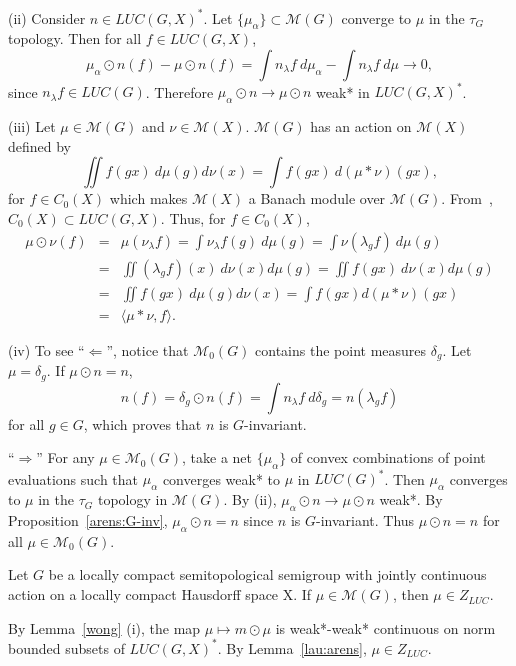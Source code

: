 (ii) Consider $n\in LUC(G,X)^*$.  Let $\{\mu_\alpha\}\subset\mathcal{M}(G)$ converge to $\mu$ in the $\tau_G$ topology.
Then for all $f\in LUC(G,X)$,
\[
{\mu}_\alpha \odot n(f) - {\mu}\odot n (f) = \int n_\lambda f\:d\mu_\alpha - \int n_\lambda f\:d\mu \rightarrow 0,
\]
since $n_\lambda f \in LUC(G)$.  Therefore ${\mu}_\alpha \odot n \rightarrow {\mu}\odot n$ weak* in $LUC(G,X)^*$.

(iii) Let $\mu\in\mathcal{M}(G)$ and $\nu\in\mathcal{M}(X)$.  $\mathcal{M}(G)$ has an action on $\mathcal{M}(X)$ defined by
\[
\iint f(gx)\:d\mu(g)d\nu(x) = \int f(gx)\:d(\mu * \nu)(gx),
\]
for $f\in C_0(X)$ which makes $\mathcal{M}(X)$ a Banach module over $\mathcal{M}(G)$.  From~\cite[p. 299]{gl:aa},
$C_0 (X) \subset LUC(G,X)$.
Thus, for $f\in C_0(X)$,
\begin{eqnarray*}
{\mu}\odot{\nu}(f) & = & {\mu}({\nu}_\lambda f) = \int {\nu}_\lambda f(g)\:d\mu(g) = \int{\nu}(\lambda_g f)\:d\mu(g) \\
& = & \iint (\lambda_g f)(x)\:d\nu(x)d\mu(g) = \iint f(gx)\:d\nu(x)d\mu(g) \\
& = & \iint f(gx)\:d\mu(g)d\nu(x) = \int f(gx) d(\mu * \nu)(gx) \\
& = & \langle {\mu * \nu}, f\rangle.
\end{eqnarray*}

(iv) To see ``$\Leftarrow$'', notice that $\mathcal{M}_0 (G)$ contains the point
measures $\delta_g$.  Let $\mu = \delta_g$.  If ${\mu}\odot n = n$,
\[
n(f) = {\delta}_g \odot n(f) = \int n_\lambda f\:d\delta_g = n(\lambda_g f)
\]
for all $g\in G$, which proves that $n$ is $G$-invariant.

``$\Rightarrow$''
For any $\mu\in \mathcal{M}_0(G)$, take a net $\{\mu_\alpha \}$
of convex combinations of point evaluations such that ${\mu}_\alpha$ converges weak* to ${\mu}$ in
$LUC(G)^*$.  Then $\mu_\alpha$ converges to $\mu$ in the $\tau_G$ topology in $\mathcal{M}(G)$.  By (ii),
${\mu}_\alpha \odot n \rightarrow {\mu}\odot n$ weak*.  By Proposition~\ref{arens:G-inv},
${\mu}_\alpha \odot n = n$ since $n$ is $G$-invariant.  Thus ${\mu}\odot n = n$
for all $\mu\in \mathcal{M}_0(G)$.
\done

\begin{theorem}\label{wong2}
Let $G$ be a locally compact semitopological semigroup with jointly continuous action
on a locally compact Hausdorff space X. If $\mu \in \mathcal{M}(G)$, then ${\mu} \in Z_{LUC}$.
\end{theorem}
\proof
By Lemma~\ref{wong} (i), the map ${\mu} \mapsto m\odot {\mu}$ is weak*-weak* continuous on norm bounded subsets
of $LUC(G,X)^*$.  By Lemma~\ref{lau:arens}, ${\mu} \in Z_{LUC}$.
\done

